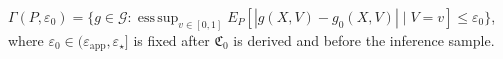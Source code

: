 \(\Gamma(P,\varepsilon_0)=\{g\in\mathcal G:\operatorname*{ess\,sup}_{v\in[0,1]}E_P[|g(X,V)-g_0(X,V)|\mid V=v]\le\varepsilon_0\}\), where \(\varepsilon_0\in(\varepsilon_{\mathrm{app}},\varepsilon_\star]\) is fixed after \(\mathfrak C_0\) is derived and before the inference sample.